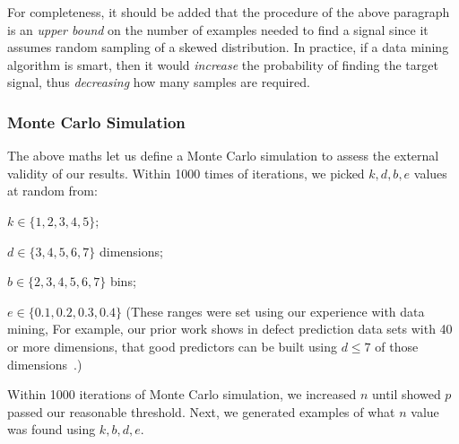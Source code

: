 For completeness, it should be added  that the procedure of the above paragraph is an {\em upper bound} on the
number of examples needed to find a signal since it
assumes random sampling of a skewed distribution. In
practice, if a data mining algorithm is smart, then
it would {\em increase} the probability of finding
the target signal, thus {\em decreasing} how many samples are required.

\subsubsection{Monte Carlo Simulation}
    The above maths let  us define
    a  Monte Carlo simulation to assess the external validity of our results.
    Within 1000 times of iterations, we picked $k,d,b,e$ values at random from:
    \squishlist
      \item $k \in \{1,2,3,4,5\}$;
  \item $d \in \{3,4,5,6,7\}$ dimensions;
  \item $b \in \{2,3,4,5,6,7\}$ bins; 
    \item $e\in \{0.1,0.2,0.3,0.4\}$
      \squishend
      (These ranges were set using our experience with data mining, For example, our prior work shows in defect prediction data sets
      with 40 or more dimensions, that good predictors can be built using $d\le 7$ of those dimensions~\cite{Menzies07}.)
      
     Within 1000 iterations of Monte Carlo simulation,
     we increased $n$ until  showed  $p$ passed our reasonable threshold.
     Next, we generated examples of what $n$ value was found using  $k,b,d,e$.
     

